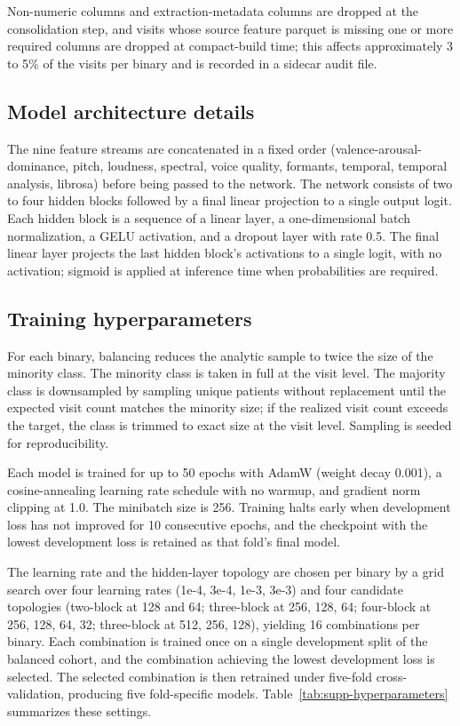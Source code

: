 \documentclass[utf8]{frontiers_suppmat} %
\begin{document}
Non-numeric columns and extraction-metadata columns are dropped at the consolidation step, and visits whose source feature parquet is missing one or more required columns are dropped at compact-build time; this affects approximately 3 to 5\% of the visits per binary and is recorded in a sidecar audit file.

\subsection{Model architecture details}
\label{supp:model-architecture}

The nine feature streams are concatenated in a fixed order (valence-arousal-dominance, pitch, loudness, spectral, voice quality, formants, temporal, temporal analysis, librosa) before being passed to the network. The network consists of two to four hidden blocks followed by a final linear projection to a single output logit. Each hidden block is a sequence of a linear layer, a one-dimensional batch normalization, a GELU activation, and a dropout layer with rate 0.5. The final linear layer projects the last hidden block's activations to a single logit, with no activation; sigmoid is applied at inference time when probabilities are required.

\subsection{Training hyperparameters}
\label{supp:training-hyperparameters}

For each binary, balancing reduces the analytic sample to twice the size of the minority class. The minority class is taken in full at the visit level. The majority class is downsampled by sampling unique patients without replacement until the expected visit count matches the minority size; if the realized visit count exceeds the target, the class is trimmed to exact size at the visit level. Sampling is seeded for reproducibility.

Each model is trained for up to 50 epochs with AdamW (weight decay 0.001), a cosine-annealing learning rate schedule with no warmup, and gradient norm clipping at 1.0. The minibatch size is 256. Training halts early when development loss has not improved for 10 consecutive epochs, and the checkpoint with the lowest development loss is retained as that fold's final model.

The learning rate and the hidden-layer topology are chosen per binary by a grid search over four learning rates (1e-4, 3e-4, 1e-3, 3e-3) and four candidate topologies (two-block at 128 and 64; three-block at 256, 128, 64; four-block at 256, 128, 64, 32; three-block at 512, 256, 128), yielding 16 combinations per binary. Each combination is trained once on a single development split of the balanced cohort, and the combination achieving the lowest development loss is selected. The selected combination is then retrained under five-fold cross-validation, producing five fold-specific models. Table~\ref{tab:supp-hyperparameters} summarizes these settings.
\end{document}
